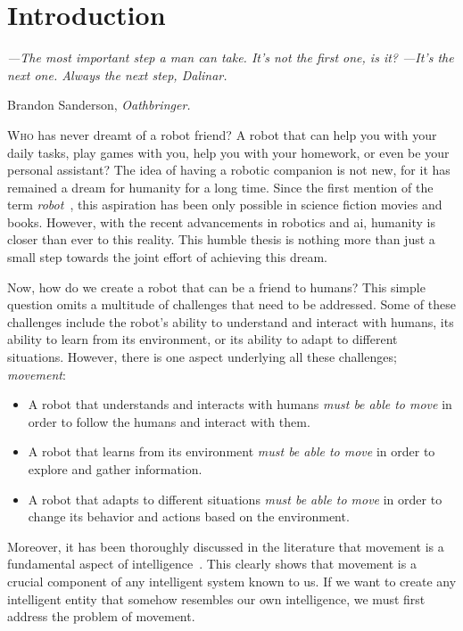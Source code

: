 \usepackage{acronym}\chapter{Introduction}\label{ch:introduction}

\setlength{}
\epigraph{\itshape ---The most important step a man can take.
It's not the first one, is it?
---It's the next one.
Always the next step, Dalinar.}{Brandon Sanderson, \textit{Oathbringer.}}

\lettrine{\textcolor{accent_color}{W}}{ho} has never dreamt of a robot friend?
A robot that can help you with your daily tasks, play games with you, help you with your homework, or even be your personal assistant?
The idea of having a robotic companion is not new, for it has remained a dream for humanity for a long time.
Since the first mention of the term \textit{robot}~\cite{robot1920}, this aspiration has been only possible in science fiction movies and books.
However, with the recent advancements in robotics and \acrfull{ai}, humanity is closer than ever to this reality.
This humble thesis is nothing more than just a small step towards the joint effort of achieving this dream.

Now, how do we create a robot that can be a friend to humans?
This simple question omits a multitude of challenges that need to be addressed.
Some of these challenges include the robot's ability to understand and interact with humans, its ability to learn from its environment, or its ability to adapt to different situations.
However, there is one aspect underlying all these challenges; \textit{movement}:

\begin{itemize}
    \item A robot that understands and interacts with humans \textit{must be able to move} in order to follow the humans and interact with them.
    \item A robot that learns from its environment \textit{must be able to move} in order to explore and gather information.
    \item A robot that adapts to different situations \textit{must be able to move} in order to change its behavior and actions based on the environment.
\end{itemize}

Moreover, it has been thoroughly discussed in the literature that movement is a fundamental aspect of intelligence~\cite{Darwin1871, Arbib2005, Leisman2016, Wolpert2011, Llinas2001}.
This clearly shows that movement is a crucial component of any intelligent system known to us.
If we want to create any intelligent entity that somehow resembles our own intelligence, we must first address the problem of movement.

